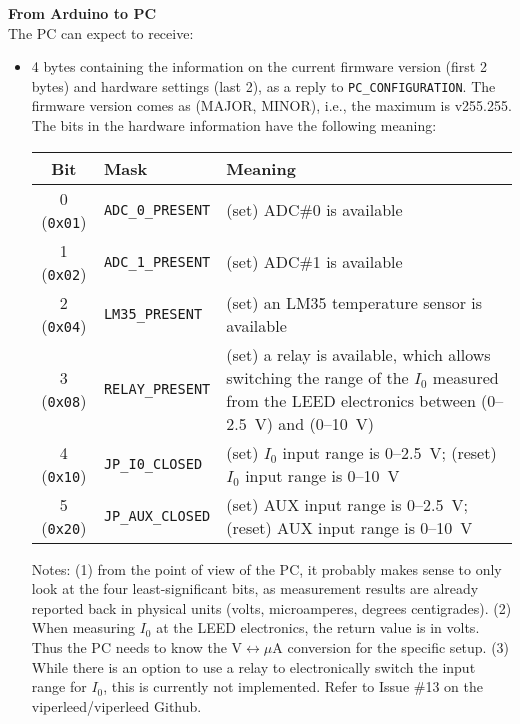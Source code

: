 \documentclass[11pt,a4paper,english]{article}
\begin{document}
\vspace*{\baselineskip}
\noindent\textbf{From Arduino to PC}\\The PC can expect to receive:
\begin{itemize}
\item 4 bytes containing the information on the current firmware version (first 2 bytes) and hardware settings (last 2), as a reply to \texttt{PC\_CONFIGURATION}. The firmware version comes as (MAJOR, MINOR), i.e., the maximum is v255.255. The bits in the hardware information have the following meaning:
	  \begin{center}
	  \begin{tabular}{clp{}}\toprule
	  Bit 				 & Mask                     & Meaning\\
	  \midrule
	  0 (\texttt{0x01})  & \texttt{ADC\_0\_PRESENT} & (set) ADC\#0 is available \\
	  1 (\texttt{0x02})  & \texttt{ADC\_1\_PRESENT} & (set) ADC\#1 is available \\
	  2 (\texttt{0x04})  & \texttt{LM35\_PRESENT}   & (set) an LM35 temperature sensor is available \\
	  3 (\texttt{0x08})  & \texttt{RELAY\_PRESENT}  & (set) a relay is available, which allows switching the range of the $I_0$ measured from the LEED electronics between (0--2.5~V) and (0--10~V)\\
	  4 (\texttt{0x10})  & \texttt{JP\_I0\_CLOSED}  & (set) $I_0$ input range is 0--2.5~V; (reset) $I_0$ input range is 0--10~V\\
	  5 (\texttt{0x20})  & \texttt{JP\_AUX\_CLOSED} & (set) AUX input range is 0--2.5~V; (reset) AUX input range is 0--10~V\\
	  \bottomrule
	  \end{tabular}
	  \end{center}
      
      Notes: (1) from the point of view of the PC, it probably makes sense to only look at the four least-significant bits, as measurement results are already reported back in physical units (volts, microamperes, degrees centigrades). (2) When measuring $I_0$ at the LEED electronics, the return value is in volts. Thus the PC needs to know the V$\leftrightarrow\mu$A conversion for the specific setup. (3) While there is an option to use a relay to electronically switch the input range for $I_0$, this is currently not implemented. Refer to Issue \#13 on the viperleed/viperleed Github.


\end{itemize}
\end{document}

